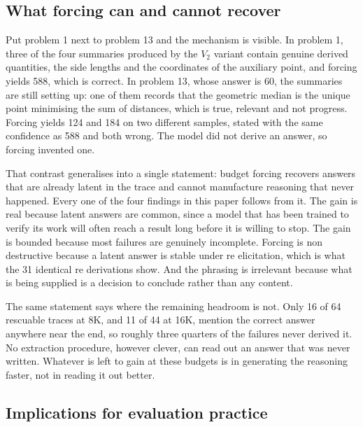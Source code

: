 \documentclass[conference]{IEEEtran}
\begin{document}
\subsection{What forcing can and cannot recover}

Put problem 1 next to problem 13 and the mechanism is visible. In problem 1, three
of the four summaries produced by the $V_2$ variant contain genuine derived
quantities, the side lengths and the coordinates of the auxiliary point, and
forcing yields 588, which is correct. In problem 13, whose answer is 60, the
summaries are still setting up: one of them records that the geometric median is
the unique point minimising the sum of distances, which is true, relevant and not
progress. Forcing yields 124 and 184 on two different samples, stated with the
same confidence as 588 and both wrong. The model did not derive an answer, so
forcing invented one.

That contrast generalises into a single statement: budget forcing recovers answers
that are already latent in the trace and cannot manufacture reasoning that never
happened. Every one of the four findings in this paper follows from it. The gain
is real because latent answers are common, since a model that has been trained to
verify its work will often reach a result long before it is willing to stop. The
gain is bounded because most failures are genuinely incomplete. Forcing is non
destructive because a latent answer is stable under re elicitation, which is what
the 31 identical re derivations show. And the phrasing is irrelevant because what
is being supplied is a decision to conclude rather than any content.

The same statement says where the remaining headroom is not. Only 16 of 64
rescuable traces at 8K, and 11 of 44 at 16K, mention the correct answer anywhere
near the end, so roughly three quarters of the failures never derived it. No
extraction procedure, however clever, can read out an answer that was never
written. Whatever is left to gain at these budgets is in generating the reasoning
faster, not in reading it out better.

\subsection{Implications for evaluation practice}
\end{document}
